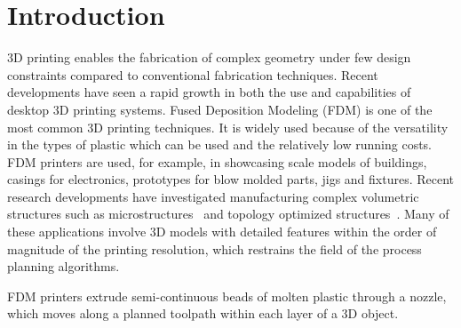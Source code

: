\section{Introduction}
3D printing enables the fabrication of complex geometry under few design constraints compared to conventional fabrication techniques.
Recent developments have seen a rapid growth in both the use and capabilities of desktop 3D printing systems.
Fused Deposition Modeling (FDM) is one of the most common 3D printing techniques.
It is widely used because of the versatility in the types of plastic which can be used and the relatively low running costs.
FDM printers are used, for example, in showcasing scale models of buildings, casings for electronics, prototypes for blow molded parts, jigs and fixtures.
Recent research developments have investigated manufacturing complex volumetric structures such as microstructures~\cite{bates2018compressive,Al-Ketan2018,Maskery2018} and topology optimized structures~\cite{Zegard2016SMO,Wu2019a,Cheng2019}.
Many of these applications involve 3D models with detailed features within the order of magnitude of the printing resolution, which restrains the field of the process planning algorithms.

FDM printers extrude semi-continuous beads of molten plastic through a nozzle, which moves along a planned toolpath within each layer of a 3D object.


